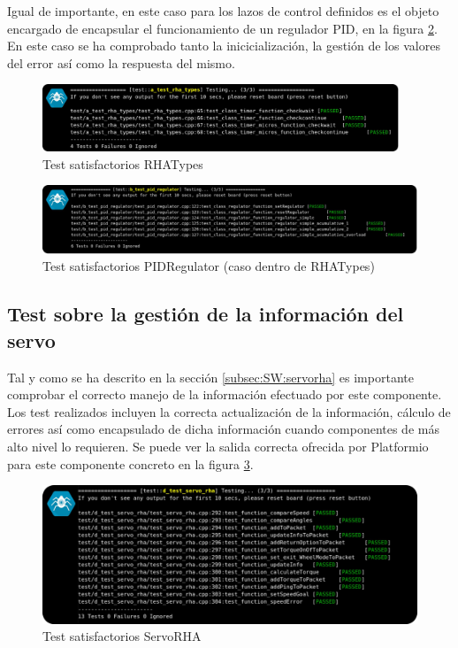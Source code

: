         Igual de importante, en este caso para los lazos de control definidos es el objeto encargado de encapsular el funcionamiento de un regulador PID, en la figura \ref{fig:SW:test:pid_regulator_ok}. En este caso se ha comprobado tanto la inicicialización, la gestión de los valores del error así como la respuesta del mismo.
        \begin{figure}[H]
            \centering
            \includegraphics[width=0.95\textwidth]{figuras/Imagenes_SW/test/SWTest_2.jpg}
            \caption{Test satisfactorios RHATypes}
            \label{fig:SW:test:rha_types_ok}
        \end{figure}
        \begin{figure}[H]
            \centering
            \includegraphics[width=1\textwidth]{figuras/Imagenes_SW/test/SWTest_9.jpg}
            \caption{Test satisfactorios PIDRegulator (caso dentro de RHATypes)}
            \label{fig:SW:test:pid_regulator_ok}
        \end{figure}

    \subsection{Test sobre la gestión de la información del servo}
        Tal y como se ha descrito en la sección \ref{subsec:SW:servorha} es importante comprobar el correcto manejo de la información efectuado por este componente. Los test realizados incluyen la correcta actualización de la información, cálculo de errores así como encapsulado de dicha información cuando componentes de más alto nivel lo requieren. Se puede ver la salida correcta ofrecida por Platformio para este componente concreto en la figura \ref{fig:SW:test:servo_rha_ok}.
        \begin{figure}[H]
            \centering
            \includegraphics[width=1\textwidth]{figuras/Imagenes_SW/test/SWTest_4.jpg}
            \caption{Test satisfactorios ServoRHA}
            \label{fig:SW:test:servo_rha_ok}
        \end{figure}

